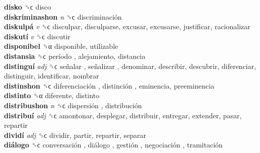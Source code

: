 \textbf{disko} ␝ϲ  disco  \\
\textbf{diskriminashon} \emph{n}  ␝ϲ   discriminación   \\
\textbf{diskulpá} \emph{v}  ␝ϲ  disculpar, disculparse, excusar, excusarse, justificar, racionalizar  \\
\textbf{diskutí} \emph{v}  ␝ϲ  discutir  \\
\textbf{disponibel} ␝α  disponible, utilizable  \\
\textbf{distansia} ␝ϲ   período , alejamiento, distancia  \\
\textbf{distinguí} \emph{adj}  ␝ϲ   señalar ,  señalizar , denominar, describir, descubrir, diferenciar, distinguir, identificar, nombrar  \\
\textbf{distinshon} ␝ϲ   diferenciación ,  distinción , eminencia, preeminencia  \\
\textbf{distinto} ␝α  diferente, distinto  \\
\textbf{distribushon} \emph{n}  ␝ϲ   dispersión ,  distribución   \\
\textbf{distribuí} \emph{adj}  ␝ϲ  amontonar, desplegar, distribuir, entregar, extender, pasar, repartir  \\
\textbf{dividí} \emph{adj}  ␝ϲ  dividir, partir, repartir, separar  \\
\textbf{diálogo} ␝ϲ   conversación ,  diálogo ,  gestión ,  negociación ,  tramitación   \\
